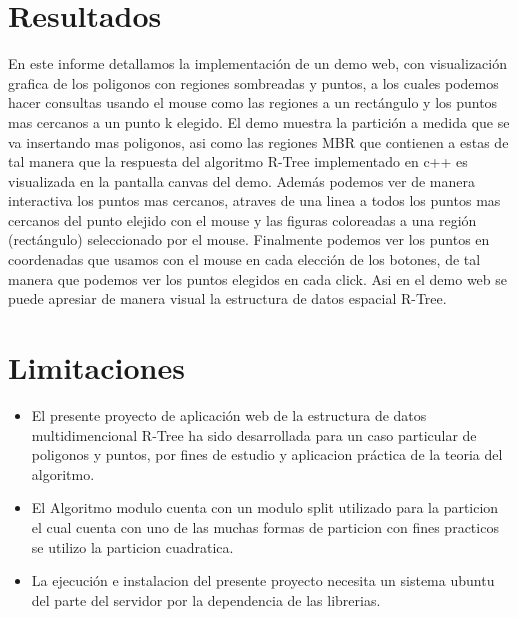 \documentclass[12pt]{article}
\begin{document}
\section*{Resultados} %
En este informe detallamos la implementación de un demo web, con visualización grafica de los poligonos con regiones sombreadas y puntos, a los cuales podemos hacer consultas usando el mouse como las regiones a un rectángulo y los puntos mas cercanos a un punto k elegido.
El demo muestra la partición a medida que se va insertando mas poligonos, asi como las regiones MBR que contienen a estas de tal manera que la respuesta del algoritmo R-Tree implementado en c++ es visualizada en la pantalla canvas del demo. Además podemos ver de manera interactiva los puntos mas cercanos, atraves de una linea a todos los puntos mas cercanos del punto elejido con el mouse y las figuras coloreadas a una región (rectángulo) seleccionado por el mouse.
Finalmente podemos ver los puntos en coordenadas que usamos con el mouse en cada elección de los botones, de tal manera que podemos ver los puntos elegidos en cada click. Asi en el demo web se puede apresiar de manera visual la estructura de datos espacial R-Tree.

\section*{Limitaciones} %
\begin{itemize}
\item El presente proyecto de aplicación web de la estructura de datos multidimencional R-Tree ha sido desarrollada para un caso particular de poligonos y puntos, por fines de estudio y aplicacion práctica de la teoria del algoritmo.
\item El Algoritmo modulo cuenta con un modulo split utilizado para la particion el cual cuenta con uno de las muchas formas de particion con fines practicos se utilizo la particion cuadratica.
\item La ejecución e instalacion del presente proyecto necesita un sistema ubuntu del parte del servidor por la dependencia de las librerias.
\end{itemize}
\end{document}

